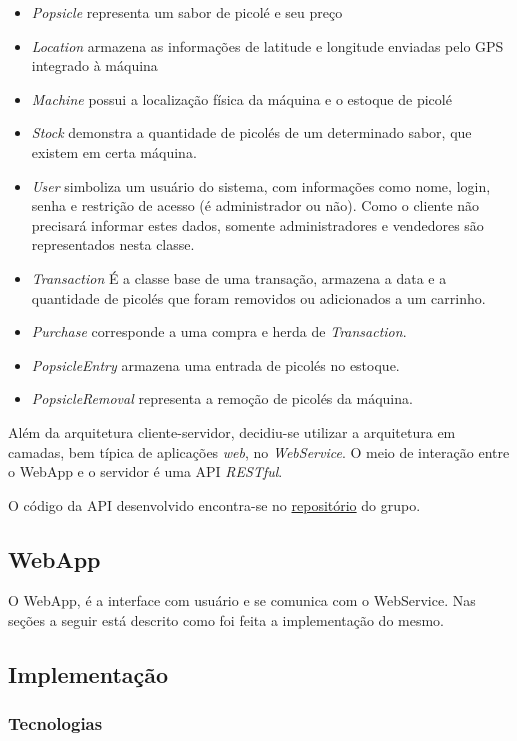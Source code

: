 \begin{itemize}
\item \textit{Popsicle} representa um sabor de picolé e seu preço
\item \textit{Location} armazena as informações de latitude e longitude enviadas pelo GPS integrado à máquina
\item \textit{Machine} possui a localização física da máquina e o estoque de picolé
\item \textit{Stock} demonstra a quantidade de picolés de um determinado sabor, que existem em certa máquina.
\item \textit{User} simboliza um usuário do sistema, com informações como nome, login, senha e restrição de acesso (é administrador ou não). Como o cliente não precisará informar estes dados, somente administradores e vendedores são representados nesta classe.
\item \textit{Transaction} É a classe base de uma transação, armazena a data e a quantidade de picolés que foram removidos ou adicionados a um carrinho.
\item \textit{Purchase} corresponde a uma compra e herda de \textit{Transaction}.
\item \textit{PopsicleEntry} armazena uma entrada de picolés no estoque.
\item \textit{PopsicleRemoval} representa a remoção de picolés da máquina.
\end{itemize}

Além da arquitetura cliente-servidor, decidiu-se utilizar a arquitetura em camadas, bem típica de aplicações \textit{web}, no \textit{WebService}. O meio de interação entre o WebApp e o servidor é uma API \textit{RESTful}.

O código da API desenvolvido encontra-se no \href{http://github.com/pi2-picole/api}{repositório} do grupo.


\subsection{WebApp}

O WebApp, é a interface com usuário e se comunica com o WebService. Nas seções a seguir está descrito como foi feita a implementação do mesmo.

\subsection{Implementação}

\subsubsection{Tecnologias}

